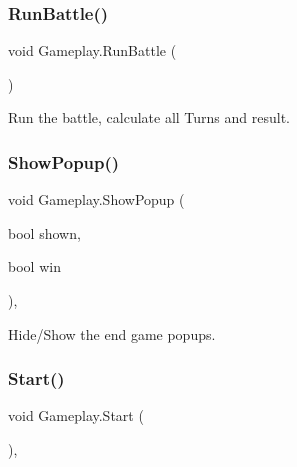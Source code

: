 \mbox{\label{class_gameplay_a314779fdcab62c148dbf587aa0ab4f67}} 
\subsubsection{\texorpdfstring{RunBattle()}{RunBattle()}}
{\footnotesize\ttfamily void Gameplay.\+Run\+Battle (\begin{DoxyParamCaption}{ }\end{DoxyParamCaption})\hspace{0.3cm}{\ttfamily [inline]}}



Run the battle, calculate all Turns and result. 

\mbox{\label{class_gameplay_a26e8c55ca4dbbfb1898a3a7bb06d679d}} 
\subsubsection{\texorpdfstring{ShowPopup()}{ShowPopup()}}
{\footnotesize\ttfamily void Gameplay.\+Show\+Popup (\begin{DoxyParamCaption}\item[{bool}]{shown,  }\item[{bool}]{win }\end{DoxyParamCaption})\hspace{0.3cm}{\ttfamily [inline]}, {\ttfamily [private]}}



Hide/\+Show the end game popups. 

\mbox{\label{class_gameplay_a3262248fce4aeecf5de2486bb3305de3}} 
\subsubsection{\texorpdfstring{Start()}{Start()}}
{\footnotesize\ttfamily void Gameplay.\+Start (\begin{DoxyParamCaption}{ }\end{DoxyParamCaption})\hspace{0.3cm}{\ttfamily [inline]}, {\ttfamily [private]}}



